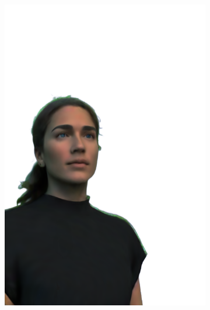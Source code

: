 \begin{figure}[ht]
\begin{subfigure}{0.08\linewidth}
        \includegraphics[width=\textwidth]{Figures/results/high/irene_3d/11_render.png}

\end{subfigure}
\end{figure}
